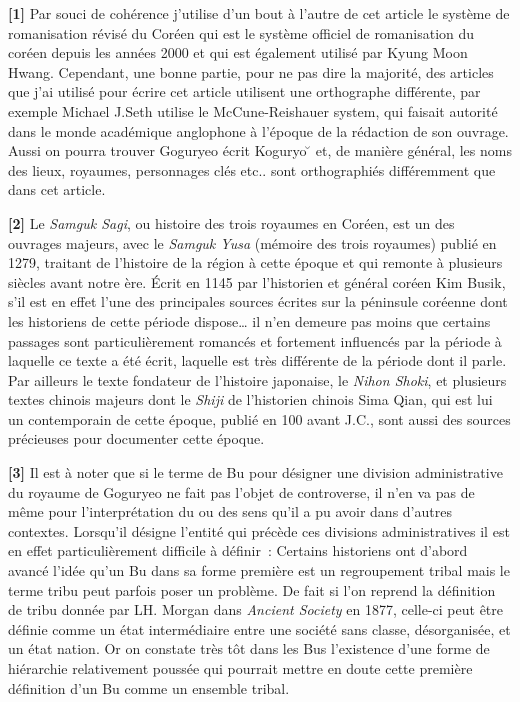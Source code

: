 \documentclass[11pt,a4paper]{article}
\begin{document}
\textbf{{[}1{]}} Par souci de cohérence j'utilise d'un bout à l'autre de cet article le système de romanisation révisé du Coréen qui est le système officiel de romanisation du coréen depuis les années 2000 et qui est également utilisé par Kyung Moon Hwang. Cependant, une bonne partie, pour ne pas dire la majorité, des articles que j'ai utilisé pour écrire cet article utilisent une orthographe différente, par exemple Michael J.Seth utilise le McCune-Reishauer system, qui faisait autorité dans le monde académique anglophone à l'époque de la rédaction de son ouvrage. Aussi on pourra trouver Goguryeo écrit Koguryo ̆ et, de manière général, les noms des lieux, royaumes, personnages clés etc.. sont orthographiés différemment que dans cet article.

\textbf{{[}2{]}} Le \emph{Samguk Sagi}, ou histoire des trois royaumes en Coréen, est un des ouvrages majeurs, avec le \emph{Samguk Yusa} (mémoire des trois royaumes) publié en 1279, traitant de l'histoire de la région à cette époque et qui remonte à plusieurs siècles avant notre ère. Écrit en 1145 par l'historien et général coréen Kim Busik, s'il est en effet l'une des principales sources écrites sur la péninsule coréenne dont les historiens de cette période dispose\ldots{} il n'en demeure pas moins que certains passages sont particulièrement romancés et fortement influencés par la période à laquelle ce texte a été écrit, laquelle est très différente de la période dont il parle. Par ailleurs le texte fondateur de l'histoire japonaise, le \emph{Nihon Shoki}, et plusieurs textes chinois majeurs dont le \emph{Shiji} de l'historien chinois Sima Qian, qui est lui un contemporain de cette époque, publié en 100 avant J.C., sont aussi des sources précieuses pour documenter cette époque.

\textbf{{[}3{]}} Il est à noter que si le terme de Bu pour désigner une division administrative du royaume de Goguryeo ne fait pas l'objet de controverse, il n'en va pas de même pour l'interprétation du ou des sens qu'il a pu avoir dans d'autres contextes. Lorsqu'il désigne l'entité qui précède ces divisions administratives il est en effet particulièrement difficile à définir~: Certains historiens ont d'abord avancé l'idée qu'un Bu dans sa forme première est un regroupement tribal mais le terme tribu peut parfois poser un problème. De fait si l'on reprend la définition de tribu donnée par LH. Morgan dans \emph{Ancient Society} en 1877, celle-ci peut être définie comme un état intermédiaire entre une société sans classe, désorganisée, et un état nation. Or on constate très tôt dans les Bus l'existence d'une forme de hiérarchie relativement poussée qui pourrait mettre en doute cette première définition d'un Bu comme un ensemble tribal.
\end{document}

